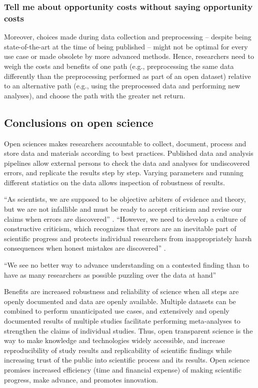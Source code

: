 \subsubsection{Tell me about opportunity costs without saying opportunity costs}

Moreover, choices made during data collection and preprocessing -- despite being
state-of-the-art at the time of being published -- might not be optimal for
every use case or made obsolete by more advanced methods.
Hence, researchers need to weigh the costs and benefits of one path (e.g.,
preprocessing the same data differently than the preprocessing performed as part
of an open dataset) relative to an alternative path (e.g., using the
preprocessed data and performing new analyses), and choose the path with the
greater net return.


\subsection{Conclusions on open science}



%
Open sciences makes researchers accountable to collect, document, process and
store data and materials according to best practices.
%
Published data and analysis pipelines allow external persons to check the data
and analyses for undiscovered errors, and replicate the results step by step.
%
Varying parameters and running different statistics on the data allows
inspection of robustness of results.

%
``As scientists, we are supposed to be objective arbiters of evidence and
theory, but we are not infallible and must be ready to accept criticism and
revise our claims when errors are discovered'' \citep{nichols2017best}.
%
``However, we need to develop a culture of constructive criticism, which
recognizes that errors are an inevitable part of scientific progress and
protects individual researchers from inappropriately harsh consequences when
honest mistakes are discovered'' \citep{nichols2017best}.

%
``We see no better way to advance understanding on a contested finding than to
have as many researchers as possible puzzling over the data at hand''
\citep{nichols2017best}

%
Benefits are increased robustness and reliability of science when all steps are
openly documented and data are openly available.
%
Multiple datasets can be combined to perform unanticipated use cases, and
extensively and openly documented results of multiple studies facilitate
performing meta-analyses to strengthen the claims of individual studies.
%
Thus, open transparent science is the way to make knowledge and technologies
widely accessible, and increase reproducibility of study results and
replicability of scientific findings while increasing trust of the public into
scientific process and its results.
%
Open science promises increased efficiency (time and financial expense) of
making scientific progress, make advance, and promotes innovation.


